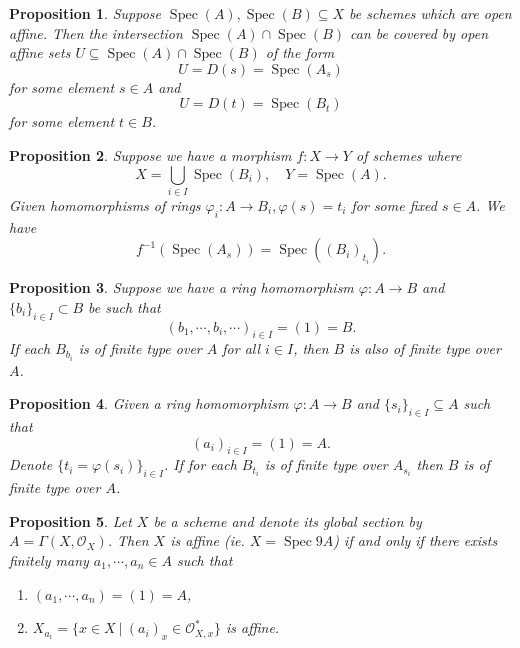 \documentclass{article}
\newtheorem{proposition}{Proposition}[section]
\numberwithin{equation}{section}
\DeclareMathOperator{\Spec}{Spec}
\begin{document}
\begin{proposition}
Suppose $\Spec(A),\Spec(B)\subseteq X$ be schemes which are open affine. Then the intersection $\Spec(A)\cap\Spec(B)$ can be covered by open affine sets $U\subseteq\Spec(A)\cap\Spec(B)$ of the form
\begin{equation*}
U = D(s)=\Spec(A_s)
\end{equation*}
for some element $s\in A$ and 
\begin{equation*}
U = D(t)=\Spec(B_t)
\end{equation*}
for some element $t\in B$.
\end{proposition}

\begin{proposition}
Suppose we have a morphism $f:X\to Y$ of schemes where 
\begin{equation*}
X = \bigcup_{i\in I} \Spec(B_i),\quad Y = \Spec(A).
\end{equation*}
Given homomorphisms of rings $\varphi_i:A\to B_i, \varphi(s) = t_i$ for some fixed $s\in A$. We have
\begin{equation*}
f^{-1}(\Spec(A_s)) = \Spec((B_i)_{t_i}).
\end{equation*}
\end{proposition}

\begin{proposition}
Suppose we have a ring homomorphism $\varphi:A\to B$ and $\{b_i\}_{i\in I}\subset B$ be such that
\begin{equation*}
(b_1,\cdots,b_i,\cdots)_{i\in I} = (1) =  B.
\end{equation*}
If each $B_{b_i}$ is of finite type over $A$ for all $i\in I$, then $B$ is also of finite type over $A$.
\end{proposition}

\begin{proposition}
Given a ring homomorphism $\varphi:A\to B$ and $\{s_i\}_{i\in I}\subseteq A$ such that
\begin{equation*}
(a_i)_{i\in I} = (1) = A.
\end{equation*}
Denote $\{t_i = \varphi(s_i)\}_{i\in I}$. If for each $B_{t_i}$ is of finite type over $A_{s_i}$ then $B$ is of finite type over $A$.
\end{proposition}

\begin{proposition}
Let $X$ be a scheme and denote its global section by $A=\Gamma(X,\mathcal{O}_X)$. Then $X$ is affine (ie. $X=\Spec9A$) if and only if there exists finitely many $a_1,\cdots,a_n\in A$ such that
\begin{enumerate}
\item $(a_1,\cdots,a_n) = (1)=A$,
\item $X_{a_i} = \{x\in X\:|\: (a_i)_x\in\mathcal{O}^*_{X,x}\}$ is affine.
\end{enumerate}
\end{proposition}
\end{document}
